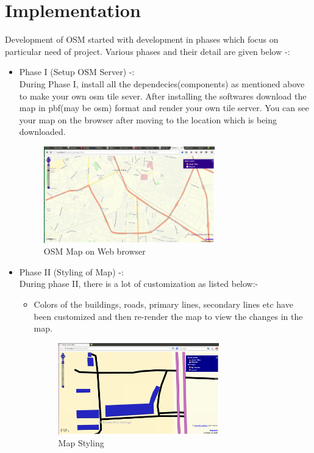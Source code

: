 \section{Implementation}
Development of OSM started with development in phases which focus on particular need of project.
Various phases and their detail are given below -:
\begin{itemize}
\item Phase I (Setup OSM Server) -: \\
        During Phase I, install all the dependecies(components) as mentioned above to make your own osm tile sever. After installing the softwares download the map in pbf(may be osm) format and render your own tile server. You can see your map on the browser after moving to the location which is being downloaded.

\begin{figure}[ht]
\centering \includegraphics[width=0.7\textwidth]{input/images/osm7.png}
\caption{OSM Map on Web browser}
\end{figure}

\item Phase II (Styling of Map) -: \\
        During phase II, there is a lot of customization as listed below:-
\begin{itemize}
\item Colors of the buildings, roads, primary lines, secondary lines etc have been customized and then re-render the map to view the changes in the map.
\begin{figure}[ht]
\centering \includegraphics[width=0.7\textwidth]{input/images/osm5.png}
\caption{Map Styling}
\end{figure}


\end{itemize}
\end{itemize}
